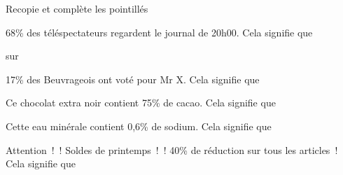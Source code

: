 Recopie et complète les pointillés
\begin{myenumerate}
\item 68\% des téléspectateurs regardent le journal de 20h00. Cela
signifie que\dotfill\par\dotfill\par\dotfill sur
\item 17\% des Beuvrageois ont voté pour Mr X. Cela signifie
que\dotfill\par\dotfill\par\dotfill
\item Ce chocolat extra noir contient 75\% de cacao. Cela signifie
que\dotfill\par\dotfill\par\dotfill
\item Cette eau minérale contient 0,6\% de sodium. Cela signifie
que\dotfill\par\dotfill\par\dotfill
\item Attention ! ! Soldes de printemps ! ! 40\% de réduction sur tous
les articles ! Cela signifie que\dotfill\par\dotfill\par\dotfill
\end{myenumerate}